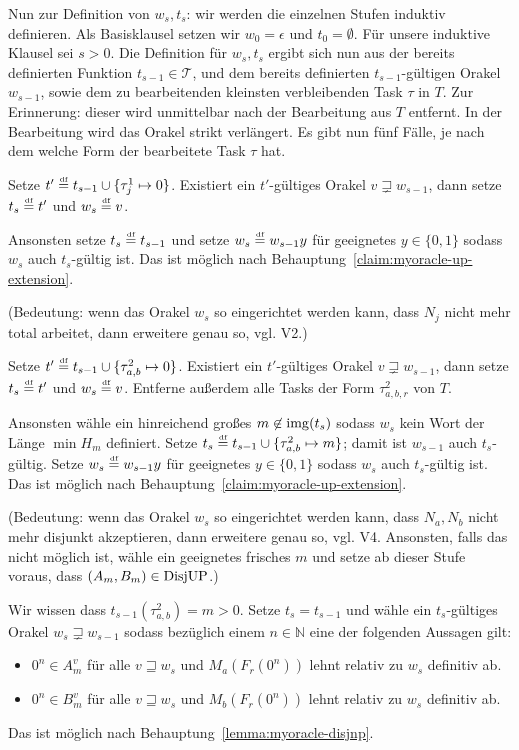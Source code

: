 Nun zur Definition von $w_s, t_s$: wir werden die einzelnen Stufen induktiv definieren. Als Basisklausel setzen wir $w_0 = \epsilon$ und $t_0 = \emptyset$.
Für unsere induktive Klausel sei $s>0$. Die Definition für $w_s, t_s$ ergibt sich nun aus der bereits definierten Funktion $t_{s-1}\in\mathcal T$, und dem bereits definierten $t_{s-1}$-gültigen Orakel $w_{s-1}$, sowie dem zu bearbeitenden kleinsten verbleibenden Task $\tau$ in $T$.
Zur Erinnerung: dieser wird unmittelbar nach der Bearbeitung aus $T$ entfernt. In der Bearbeitung wird das Orakel strikt verlängert.
Es gibt nun fünf Fälle, je nach dem welche Form der bearbeitete Task $\tau$ hat.
\begin{description}[leftmargin=\parindent]
    \item[Task $\tau^1_j$:] Setze $t'\stackrel{\text{\smash{\tiny df}}}{=} t_{s-1}\cup\{\tau^1_j\mapsto 0\}$. Existiert ein $t'$-gültiges Orakel $v\sqsupsetneq w_{s-1}$, dann setze $t_s\stackrel{\text{\smash{\tiny df}}}{=} t'$ und $w_s\stackrel{\text{\smash{\tiny df}}}{=} v$.

        Ansonsten setze $t_s\stackrel{\text{\smash{\tiny df}}}{=} t_{s-1}$ und setze $w_s\stackrel{\text{\smash{\tiny df}}}{=} w_{s-1}y$ für geeignetes $y\in\{0,1\}$ sodass $w_s$ auch $t_s$-gültig ist. Das ist möglich nach Behauptung~\ref{claim:myoracle-up-extension}.

        (Bedeutung: wenn das Orakel $w_s$ so eingerichtet werden kann, dass $N_j$ nicht mehr total arbeitet, dann erweitere genau so, vgl. V2.) 

    \item[Task $\tau^2_{a,b}$:] Setze $t'\stackrel{\text{\smash{\tiny df}}}{=} t_{s-1}\cup\{\tau^2_{a,b}\mapsto 0\}$. Existiert ein $t'$-gültiges Orakel $v\sqsupsetneq w_{s-1}$, dann setze $t_s\stackrel{\text{\smash{\tiny df}}}{=} t'$ und $w_s\stackrel{\text{\smash{\tiny df}}}{=} v$. Entferne außerdem alle Tasks der Form $\tau^2_{a,b,r}$ von $T$.

        Ansonsten wähle ein hinreichend großes $m\not\in \operatorname{img}(t_s)$ sodass $w_s$ kein Wort der Länge $\min H_m$ definiert. Setze $t_s\stackrel{\text{\smash{\tiny df}}}{=} t_{s-1}\cup \{ \tau^2_{a,b}\mapsto m \}$; damit ist $w_{s-1}$ auch $t_s$-gültig. Setze $w_s\stackrel{\text{\smash{\tiny df}}}{=} w_{s-1}y$ für geeignetes $y\in\{0,1\}$ sodass $w_s$ auch $t_s$-gültig ist. Das ist möglich nach Behauptung~\ref{claim:myoracle-up-extension}.

        (Bedeutung: wenn das Orakel $w_s$ so eingerichtet werden kann, dass $N_a, N_b$ nicht mehr disjunkt akzeptieren, dann erweitere genau so, vgl. V4. Ansonsten, falls das nicht möglich ist, wähle ein geeignetes frisches $m$ und setze ab dieser Stufe voraus, dass $(A_m, B_m)\in \mathrm{DisjUP}$.) 

    \item[Task $\tau^2_{a,b,r}$:] Wir wissen dass $t_{s-1}(\tau^2_{a,b})=m>0$. Setze $t_s=t_{s-1}$ und wähle ein $t_s$-gültiges Orakel $w_s\sqsupsetneq w_{s-1}$ sodass bezüglich einem $n\in\mathbb N$ eine der folgenden Aussagen gilt:
        \begin{itemize}[nosep,endpenalty=10000]
            \item $0^n\in A_m^v$ für alle $v\sqsupseteq w_s$ und $M_a(F_r(0^n))$ lehnt relativ zu $w_s$ definitiv ab.
            \item $0^n\in B_m^v$ für alle $v\sqsupseteq w_s$ und $M_b(F_r(0^n))$ lehnt relativ zu $w_s$ definitiv ab.
        \end{itemize} Das ist möglich nach Behauptung~\ref{lemma:myoracle-disjnp}.


\end{description}
